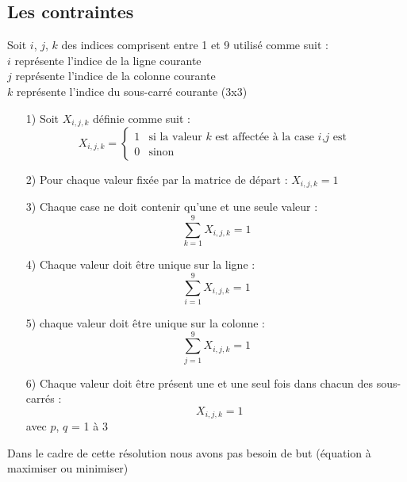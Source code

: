 \documentclass[10pt]{beamer}
\begin{document}
\begin{frame}
\section{Les contraintes}
\small
Soit $i$, $j$, $k$ des indices comprisent entre 1 et 9 utilisé comme suit :\\
$i$ représente l'indice de la ligne courante \\
$j$ représente l'indice de la colonne courante \\
$k$ représente l'indice du sous-carré courante (3x3) \\
\begin{enumerate}
\item[1)] Soit $X_{i,j,k}$ définie comme suit :
\begin{equation}
X_{i,j,k} =
\begin{cases}
1 & \text{si la valeur $k$ est affectée à la case $i$,$j$ est  } 
\\
0 & \text{sinon } 
\end{cases}
\end{equation}
\item[2)]Pour chaque valeur fixée par la matrice de départ : $X_{i,j,k} = 1$
\item[3)]Chaque case ne doit contenir qu'une et une seule valeur : $$\sum_{k=1}^{9} X_{i,j,k} = 1$$
\item[4)]Chaque valeur doit être unique sur la ligne : $$\sum_{i=1}^{9} X_{i,j,k} = 1$$
\end{enumerate}
\end{frame}

\begin{frame}
\begin{enumerate}
\item[5)]chaque valeur doit être unique sur la colonne : $$\sum_{j=1}^{9} X_{i,j,k} = 1$$
\item[6)] Chaque valeur doit être présent une et une seul fois dans chacun des sous-carrés : \\
$$\mathop{\sum_{j=3p-2}^{3p}\sum_{i=3p-2}^{3q}} X_{i,j,k} = 1$$ avec $p$, $q$ = 1 à 3
\end{enumerate}
Dans le cadre de cette résolution nous avons pas besoin de but (équation à maximiser ou minimiser)
\end{frame}
\end{document}
